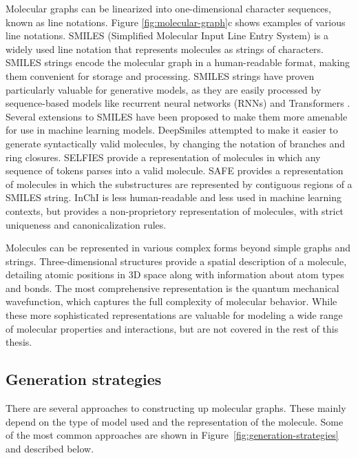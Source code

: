 Molecular graphs can be linearized into one-dimensional character sequences, known as line
notations. Figure \ref{fig:molecular-graph}c shows examples of various line notations. SMILES
(Simplified Molecular Input Line Entry System) \citep{weiningerSMILESChemicalLanguage1988} is a
widely used line notation that represents molecules as strings of characters. SMILES strings encode
the molecular graph in a human-readable format, making them convenient for storage and processing.
SMILES strings have proven particularly valuable for generative models, as they are easily processed
by sequence-based models like recurrent neural networks (RNNs) and Transformers
\citep{vaswaniAttentionAllYou2017}. Several extensions to SMILES have been proposed to make them
more amenable for use in machine learning models. DeepSmiles
\citep{oboyleDeepSMILESAdaptationSMILES2018} attempted to make it easier to generate syntactically
valid molecules, by changing the notation of branches and ring closures. SELFIES
\citep{krennSELFIESFutureMolecular2022} provide a representation of molecules in which any sequence
of tokens parses into a valid molecule. SAFE \citep{noutahiGottaBeSAFE2023} provides a
representation of molecules in which the substructures are represented by contiguous regions of a
SMILES string. InChI \citep{hellerInChIIUPACInternational2015} is less human-readable and less used
in machine learning contexts, but provides a non-proprietory representation of molecules, with
strict uniqueness and canonicalization rules.

Molecules can be represented in various complex forms beyond simple graphs and strings.
Three-dimensional structures provide a spatial description of a molecule, detailing atomic positions
in 3D space along with information about atom types and bonds. The most comprehensive representation
is the quantum mechanical wavefunction, which captures the full complexity of molecular behavior.
While these more sophisticated representations are valuable for modeling a wide range of molecular
properties and interactions, but are not covered in the rest of this thesis.

\subsection{Generation strategies}
There are several approaches to constructing up molecular graphs. These mainly depend
on the type of model used and the representation of the molecule.
Some of the most common approaches are shown in Figure~\ref{fig:generation-strategies} and
described below.

